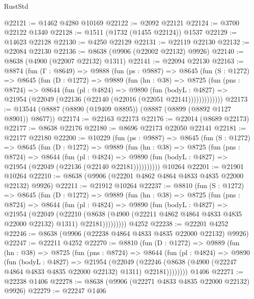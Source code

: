 \begin{lexlean}{RustStd}
\begin{coremodule}
@22121 := @1462 @4280 @10169
@22122 := @2092 @22121
@22124 := @3700 @22122 @1340
@22128 := @1511 (@1732 (@1455 @22124)) @1537
@22129 := @14623 @22128
@22130 := @4250 @22129
@22131 := @22119 @22130
@22132 := @22084 @22130
@22136 := @8638 (@9906 (@22002 @22132) @9926)
@22140 := @8638 (@4900 (@22007 @22132) @1311)
@22141 := @22094 @22130
@22163 := @8874
    (fun (Γ : @8649) =>
    @9888
      (fun (ps : @9887) =>
      @8645
        (fun (S : @1272) =>
        @8645
          (fun (D : @1272) =>
          @9889
            (fun (hn : @38) =>
            @8725
              (fun (pns : @8724) =>
              @8644
                (fun (pl : @4824) =>
                @9890
                  (fun (bodyL : @4827) =>
                  @21954 (@22049 (@22136 (@22140 (@22016 (@22051 @22141)))))))))))))
@22173 := @13544 (@8887 (@8890 (@19409 @8895)) (@8887 (@8899 (@8892 @1127 @8901)) @8677))
@22174 := @22163 @22173
@22176 := @22014 (@8689 @22173)
@22177 := @8638 @22176
@22180 := @8696 @22173 @22050 @22141
@22181 := @22177 @22180
@22200 := @10229
    (fun (ps : @9887) =>
    @8645
      (fun (S : @1272) =>
      @8645
        (fun (D : @1272) =>
        @9889
          (fun (hn : @38) =>
          @8725
            (fun (pns : @8724) =>
            @8644
              (fun (pl : @4824) =>
              @9890 (fun (bodyL : @4827) => @21954 (@22049 (@22136 (@22140 @22181))))))))))
    @10264
@22201 := @21901 @10264
@22210 := @8638 (@9906 (@22201 @4862 @4864 @4833 @4835 @22000 @22132) @9926)
@22211 := @21912 @10264
@22237 := @8810
    (fun (S : @1272) =>
    @8645
      (fun (D : @1272) =>
      @9889
        (fun (hn : @38) =>
        @8725
          (fun (pns : @8724) =>
          @8644
            (fun (pl : @4824) =>
            @9890
              (fun (bodyL : @4827) =>
              @21954
                (@22049
                  (@22210
                    (@8638
                      (@4900 (@22211 @4862 @4864 @4833 @4835 @22000 @22132) @1311)
                      @22181)))))))))
    @4252
@22238 := @22201 @4252
@22246 := @8638 (@9906 (@22238 @4864 @4833 @4835 @22000 @22132) @9926)
@22247 := @22211 @4252
@22270 := @8810
    (fun (D : @1272) =>
    @9889
      (fun (hn : @38) =>
      @8725
        (fun (pns : @8724) =>
        @8644
          (fun (pl : @4824) =>
          @9890
            (fun (bodyL : @4827) =>
            @21954
              (@22049
                (@22246 (@8638 (@4900 (@22247 @4864 @4833 @4835 @22000 @22132) @1311) @22181))))))))
    @1406
@22271 := @22238 @1406
@22278 := @8638 (@9906 (@22271 @4833 @4835 @22000 @22132) @9926)
@22279 := @22247 @1406

\end{coremodule}
\end{lexlean}
